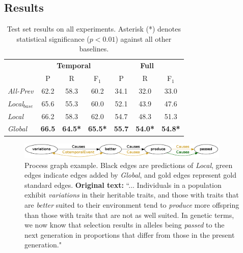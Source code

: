 \subsection{Results} \label{subsec:results}

\begin{table}[t]
{\footnotesize
\begin{tabular}{| l | c | c | c | c | c | c |}
\hline
    & \multicolumn{3}{c|}{\textbf{Temporal}} & \multicolumn{3}{c|}{\textbf{Full}} \\
    & P & R & F$_1$ & P & R & F$_1$ \\
\hline
\hline
\emph{All-Prev} & 62.2 & 58.3 & 60.2 & 34.1 & 32.0 & 33.0 \\
\emph{Local$_{base}$} & 65.6 & 55.3 & 60.0 &  52.1 & 43.9 & 47.6\\
\emph{Local} & 66.2 & 58.3 & 62.0 & 54.7 & 48.3 & 51.3 \\
\emph{Global} & \textbf{66.5} & \textbf{64.5*} & \textbf{65.5*} & \textbf{55.7} & \textbf{54.0*} & \textbf{54.8*} \\
\hline
\end{tabular}}
\caption{Test set results on all experiments. Asterisk (*) denotes statistical significance ($p<0.01$) against all other baselines.}
\label{tab:results}
\end{table}


\begin{figure}[t]
\centering
\includegraphics[width=0.9\textwidth]{figures/p144.png} 
\caption{Process graph example. Black edges are predictions of \emph{Local}, green edges indicate edges added by \emph{Global}, and gold edges represent gold standard edges. \textbf{Original text:} ``... Individuals in a population exhibit \emph{variations} in their heritable traits, and those with traits that are \emph{better} suited to their environment tend to \emph{produce} more offspring than those with traits that are not as well suited. In genetic terms, we now know that selection results in alleles being \emph{passed} to the next generation in proportions that differ from those in the present generation."}
\label{fig:graph}
\end{figure}



